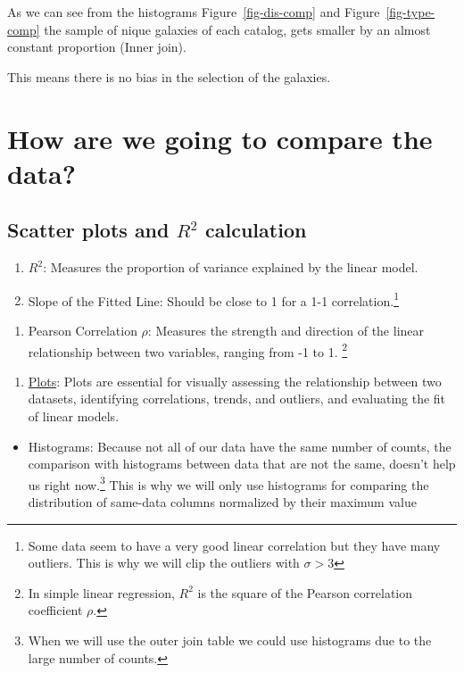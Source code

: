\documentclass[
]{article}
\providecommand{\tightlist}{%
  \setlength{\itemsep}{0pt}\setlength{\parskip}{0pt}}\usepackage{longtable,booktabs,array}
\begin{document}
As we can see from the histograms Figure~\ref{fig-dis-comp} and
Figure~\ref{fig-type-comp} the sample of nique galaxies of each catalog,
gets smaller by an almost constant proportion (Inner join).

This means there is no bias in the selection of the galaxies.

\section{How are we going to compare the
data?}\label{how-are-we-going-to-compare-the-data}

\subsection{\texorpdfstring{Scatter plots and \(R^2\)
calculation}{Scatter plots and R\^{}2 calculation}}\label{scatter-plots-and-r2-calculation}

\begin{enumerate}
\def\labelenumi{\arabic{enumi}.}
\tightlist
\item
  \(R^2\): Measures the proportion of variance explained by the linear
  model.
\item
  Slope of the Fitted Line: Should be close to 1 for a 1-1
  correlation.\footnote{Some data seem to have a very good linear
    correlation but they have many outliers. This is why we will clip
    the outliers with \(\sigma > 3\)}
\end{enumerate}

\begin{enumerate}
\def\labelenumi{\arabic{enumi}.}
\setcounter{enumi}{2}
\tightlist
\item
  Pearson Correlation \(\rho\): Measures the strength and direction of
  the linear relationship between two variables, ranging from -1 to 1.
  \footnote{In simple linear regression, \(R^2\) is the square of the
    Pearson correlation coefficient \(\rho\).}
\end{enumerate}

\begin{enumerate}
\def\labelenumi{\arabic{enumi}.}
\setcounter{enumi}{3}
\tightlist
\item
  \ul{Plots}: Plots are essential for visually assessing the
  relationship between two datasets, identifying correlations, trends,
  and outliers, and evaluating the fit of linear models.
\end{enumerate}

\begin{itemize}
\tightlist
\item
  Histograms: Because not all of our data have the same number of
  counts, the comparison with histograms between data that are not the
  same, doesn't help us right now.\footnote{When we will use the outer
    join table we could use histograms due to the large number of
    counts.} This is why we will only use histograms for comparing the
  distribution of same-data columns normalized by their maximum value
\end{itemize}
\end{document}
